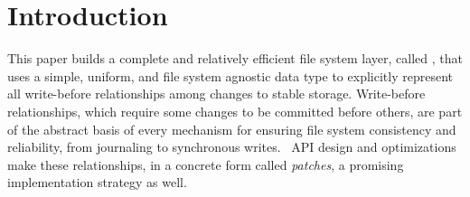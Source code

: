 
\section {Introduction}
\label{sec:intro}

\begin{comment}
This paper aims to evaluate whether a simple, unified abstraction that
represents all modifications to stable storage, including
\emph{dependencies} among modifications, can be used to efficiently
implement a complete file system layer, where modifications are common
and cache sizes are large.
%
The answer is a qualified yes.
\end{comment}


This paper builds a complete and relatively efficient file system layer,
 called \emph{\Featherstitch}, that uses
 a simple, uniform, and file system agnostic data type to explicitly
 represent all write-before relationships among changes to stable
 storage.
%
Write-before relationships, which require some changes to be committed
 before others, are part of the abstract basis of every mechanism for ensuring file system
 consistency and reliability, from journaling to synchronous writes.
%
\Kudos\ API design and optimizations make these relationships, in a concrete form
 called \emph{patches}, a promising implementation strategy as well.


\begin{comment}
As file system functionality increases, maintaining file system
 correctness in the presence of failures is increasingly a focus of
 research~\cite{sivathanuetal05-logic,denehyetal05-journal-guided}.
%
File systems today deal with many challenges that make implementing this
 property difficult: power losses, software failures, and even user
 intervention all pose significant threats.
%
To meet this challenge, file systems use a variety of techniques, like
 journaling and soft updates.
%
These mechanisms are each based on imposing some write-before
 relationship among buffered changes to the data in stable storage.
%
The answer is a qualified yes.
\end{comment}


